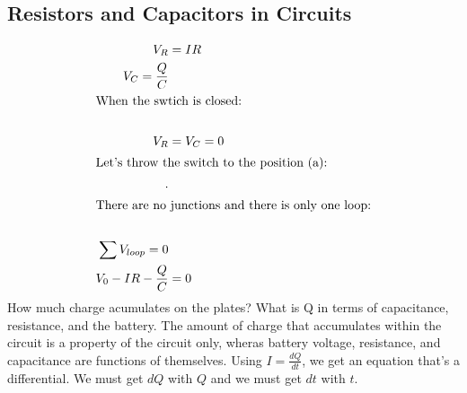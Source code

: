   \subsection{Resistors and Capacitors in Circuits}
  \begin{align*}
    V_R&=IR\\
    V_C=\frac{Q}{C}\\
    \shortintertext{When the swtich is closed:}\\
    V_R&=V_C=0\\
    \shortintertext{Let's throw the switch to the position (a):}.\\
    \shortintertext{There are no junctions and there is only one loop:}\\
    \sum V_{loop} = 0\\
    V_0-IR-\frac{Q}{C}&=0\\
  \end{align*}
  How much charge acumulates on the plates? What is Q in terms of capacitance, resistance, and the battery. The amount of charge that accumulates within the circuit is a property of the circuit only, wheras battery voltage, resistance, and capacitance are functions of themselves. Using $I=\frac{dQ}{dt}$, we get an equation that's a differential. We must get $dQ$ with $Q$ and we must get $dt$ with $t$.
